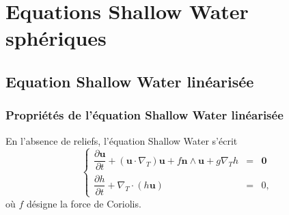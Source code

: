 \chapter{Equations Shallow Water sphériques}
\label{chap:6}

\section{Equation Shallow Water linéarisée}

\subsection{Propriétés de l'équation Shallow Water linéarisée}

En l'absence de reliefs, l'équation Shallow Water s'écrit
\begin{equation}
\label{eq:SWE_without relief}
\left\lbrace
\begin{array}{rcl}
\dfrac{\partial \mathbf{u}}{\partial t} + \left( \mathbf{u} \cdot \nabla_T \right) \mathbf{u} + f \mathbf{n} \wedge \mathbf{u} + g \nabla_T h & = & \mathbf{0} \\
\dfrac{\partial h}{\partial t} + \nabla_T \cdot \left( h \mathbf{u} \right) & = & 0,
\end{array}
\right.
\end{equation}
où $f$ désigne la force de Coriolis.

